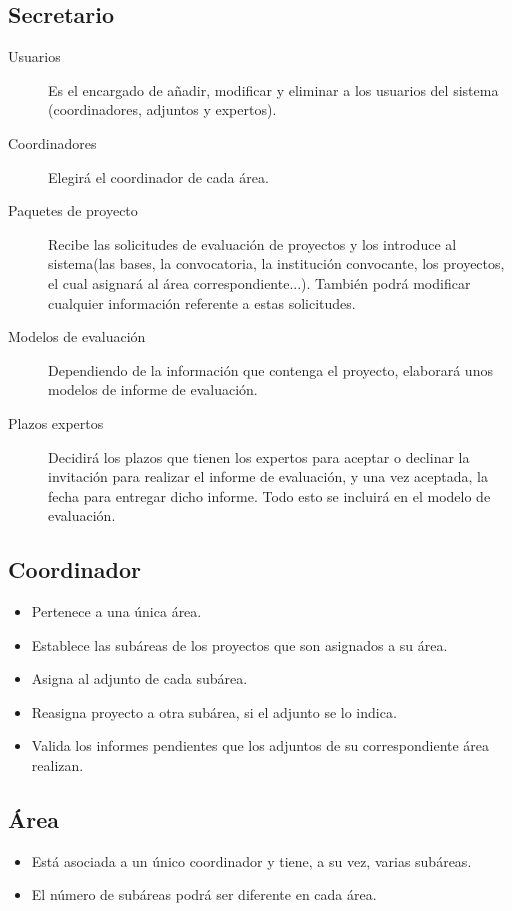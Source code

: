 \documentclass[12pt,a4paper,titlepage,spanish,twoside]{book}
\begin{document}
\subsection{Secretario}
\begin{description}
\item[Usuarios] Es el encargado de añadir, modificar y eliminar a los
  usuarios del sistema (coordinadores, adjuntos y expertos).
\item[Coordinadores] Elegirá el coordinador de cada área.
\item[Paquetes de proyecto] Recibe las solicitudes de evaluación de proyectos
  y los introduce al sistema(las bases, la convocatoria, la institución
  convocante, los proyectos, el cual asignará al área correspondiente...). 
  También podrá modificar cualquier información referente a estas
  solicitudes. 
\item[Modelos de evaluación] Dependiendo de la información que contenga el
  proyecto, elaborará unos modelos de informe de evaluación. 
\item[Plazos expertos] Decidirá los plazos que tienen los expertos para
  aceptar o declinar la invitación para realizar el informe de evaluación,
  y una vez aceptada, la fecha para entregar dicho informe. Todo esto
  se incluirá en el modelo de evaluación.
\end{description}

\subsection{Coordinador}
\begin{itemize}
\item Pertenece a una única área.
\item Establece las subáreas de los proyectos que son asignados a su área.
\item Asigna al adjunto de cada subárea.
\item Reasigna proyecto a otra subárea, si el adjunto se lo indica.
\item Valida los informes pendientes que los adjuntos de su correspondiente 
  área realizan.
\end{itemize}

\subsection{Área}
\begin{itemize}
\item Está asociada a un único coordinador y tiene, a su vez, varias subáreas. 
\item El número de subáreas podrá ser diferente en cada área.
\end{itemize}
\end{document}
